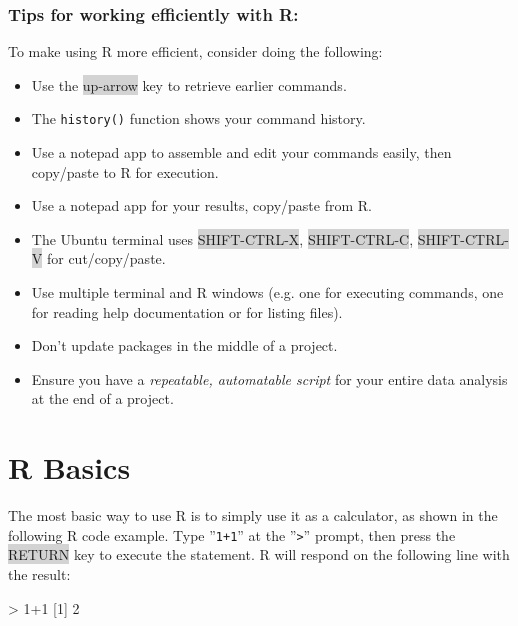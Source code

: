 \begin{tcolorbox}[colback=code]
\subsubsection*{Tips for working efficiently with R:}

To make using R more efficient, consider doing the following:

\begin{itemize}
    \item Use the {\footnotesize\colorbox{lightgray}{up-arrow}} key to retrieve earlier commands.
    \item The \texttt{history()} function shows your command history.
    \item Use a notepad app to assemble and edit your commands easily, then copy/paste to R for execution.
    \item Use a notepad app for your results, copy/paste from R.
    \item The Ubuntu terminal uses {\footnotesize\colorbox{lightgray}{SHIFT-CTRL-X}}, {\footnotesize\colorbox{lightgray}{SHIFT-CTRL-C}}, {\footnotesize\colorbox{lightgray}{SHIFT-CTRL-V}} for cut/copy/paste.
    \item Use multiple terminal and R windows (e.g. one for executing commands, one for reading help documentation or for listing files).
    \item Don't update packages in the middle of a project.
    \item Ensure you have a \emph{repeatable, automatable script} for your entire data analysis at the end of a project.
\end{itemize}

\end{tcolorbox}

\section{R Basics}

The most basic way to use R is to simply use it as a calculator, as shown in the following R code example. Type ''\texttt{1+1}'' at the ''\texttt{>}'' prompt, then press the \colorbox{lightgray}{RETURN} key to execute the statement. R will respond on the following line with the result:

\begin{samepage}
\begin{Rcode}
> 1+1
[1] 2
\end{Rcode}
\end{samepage}

